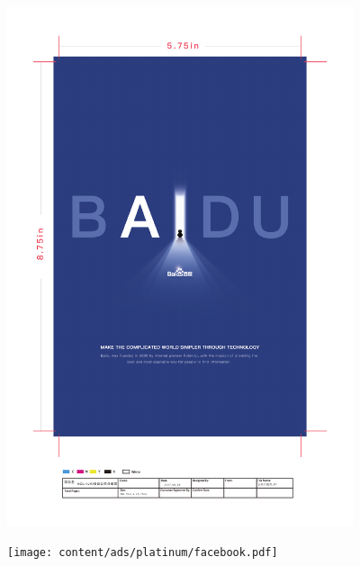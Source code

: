 \thispagestyle{empty}
\begin{center}
  \vfill
  \includegraphics[width=4in]{content/ads/platinum/baidu.pdf}
  \vfill
\end{center}
\clearpage
%


\thispagestyle{empty}
\begin{center}
  \vfill
  \texttt{[image: content/ads/platinum/facebook.pdf]}
  \vfill
\end{center}
\clearpage

